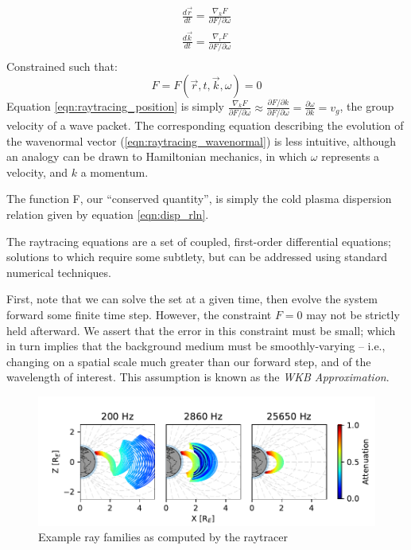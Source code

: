 \begin{eqnarray}
\frac{d\vec{r}}{dt} = \frac{\nabla_kF}{\partial F/\partial \omega} \label{eqn:raytracing_position}\\
\frac{d\vec{k}}{dt} = \frac{\nabla_rF}{\partial F/\partial \omega} \label{eqn:raytracing_wavenormal} \\
\end{eqnarray}
Constrained such that:
\begin{equation}
F = F(\vec{r},t,\vec{k},\omega) = 0
\end{equation}
Equation \ref{eqn:raytracing_position} is simply $\frac{\nabla_kF}{\partial F/\partial \omega} \approx\frac{\partial F/\partial k}{\partial F /\partial \omega} = \frac{\partial \omega}{\partial k} = v_g$, the group velocity of a wave packet. The corresponding equation describing the evolution of the wavenormal vector (\ref{eqn:raytracing_wavenormal}) is less intuitive, although an analogy can be drawn to Hamiltonian mechanics, in which $\omega$ represents a velocity, and $k$ a momentum.

The function F, our ``conserved quantity'', is simply the cold plasma dispersion relation given by equation \ref{eqn:disp_rln}.

The raytracing equations are a set of coupled, first-order differential equations; solutions to which require some subtlety, but can be addressed using standard numerical techniques.

First, note that we can solve the set at a given time, then evolve the system forward some finite time step. However, the constraint $F=0$ may not be strictly held afterward. We assert that the error in this constraint must be small; which in turn implies that the background medium must be smoothly-varying -- i.e., changing on a spatial scale much greater than our forward step, and of the wavelength of interest. This assumption is known as the \emph{WKB Approximation}.
\begin{figure}[ht]
\begin{center}
\includegraphics{Figures/raytracing_example.pdf}
\end{center}
\caption[Example ray tracing]{Example ray families as computed by the raytracer}
\end{figure}
